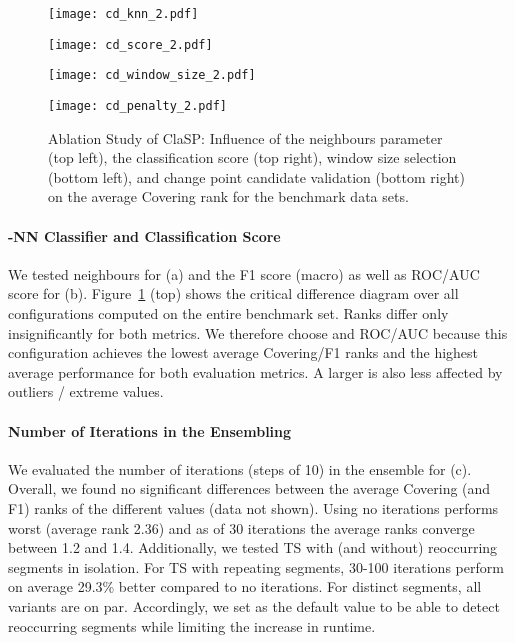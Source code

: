 \documentclass[pdflatex,sn-basic]{sn-jnl}
\begin{document}
\begin{figure}[t]
	\begin{minipage}{6cm}
        \texttt{[image: cd\_knn\_2.pdf]}
	\end{minipage}
	\begin{minipage}{6cm}
        \texttt{[image: cd\_score\_2.pdf]}
	\end{minipage}
	\begin{minipage}{6cm}
        \texttt{[image: cd\_window\_size\_2.pdf]}
	\end{minipage}
	\begin{minipage}{6cm}
        \texttt{[image: cd\_penalty\_2.pdf]}
	\end{minipage}
	\caption{Ablation Study of ClaSP: Influence of the  neighbours parameter (top left), the classification score (top right), window size selection (bottom left), and change point candidate validation (bottom right) on the average Covering rank for the  benchmark data sets.\label{fig:cd_design_choices}
	}
\end{figure}

\paragraph{-NN Classifier and Classification Score}
We tested  neighbours for (a) and the F1 score (macro) as well as ROC/AUC score for (b). Figure~\ref{fig:cd_design_choices} (top) shows the critical difference diagram over all configurations computed on the entire benchmark set. Ranks differ only insignificantly for both metrics. We therefore choose  and ROC/AUC because this configuration achieves the lowest average Covering/F1 ranks and the highest average performance for both evaluation metrics. A larger  is also less affected by outliers / extreme values.

\paragraph{Number of Iterations in the Ensembling}
We evaluated the number of iterations  (steps of 10) in the ensemble for (c). Overall, we found no significant differences between the average Covering (and F1) ranks of the different values (data not shown). Using no iterations performs worst (average rank 2.36) and as of 30 iterations the average ranks converge between 1.2 and 1.4. Additionally, we tested TS with (and without) reoccurring segments in isolation. For TS with repeating segments, 30-100 iterations perform on average 29.3\% better compared to no iterations. For distinct segments, all variants are on par. Accordingly, we set   as the default value to be able to detect reoccurring segments while limiting the increase in runtime.
\end{document}

